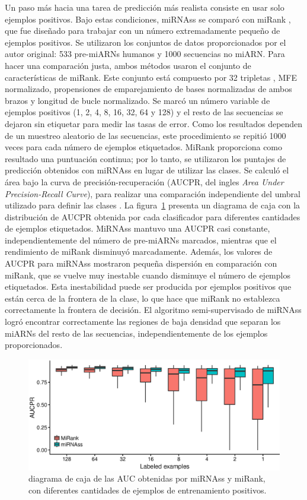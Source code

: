 Un paso más hacia una tarea de predicción más realista consiste en usar solo ejemplos positivos. Bajo estas condiciones, miRNAss se comparó con miRank
\citep{xu2008microrna}, que fue diseñado para trabajar con un número extremadamente pequeño de ejemplos positivos. Se utilizaron los conjuntos de datos
proporcionados por el autor original: 533 pre-miARNs humanos y 1000 secuencias no miARN. Para hacer una comparación justa, ambos métodos usaron el conjunto
de características de miRank. Este conjunto está compuesto por 32 tripletas \citep{xue2005classification}, MFE normalizado, propensiones de emparejamiento de
bases normalizadas de ambos brazos y longitud de bucle normalizado. Se marcó un número variable de ejemplos positivos (1, 2, 4, 8, 16, 32, 64 y 128) y el
resto de las secuencias se dejaron sin etiquetar para medir las tasas de error. Como los resultados dependen de un muestreo aleatorio de las secuencias, este
procedimiento se repitió 1000 veces para cada número de ejemplos etiquetados. MiRank proporciona como resultado una puntuación continua; por lo tanto, se
utilizaron los puntajes de predicción obtenidos con miRNAss en lugar de utilizar las clases. Se calculó el área bajo la curva de precisión-recuperación
(AUCPR, del ingles \textit{Area Under Precision-Recall Curve}), para realizar una comparación independiente del umbral utilizado para definir las clases
\citep{bradley1997use}.
La figura~\ref{fig:miRank} presenta un diagrama de caja con la distribución de AUCPR obtenida por cada clasificador para diferentes cantidades de ejemplos
etiquetados. MiRNAss mantuvo una AUCPR casi constante, independientemente del número de pre-miARNs marcados, mientras que el rendimiento de miRank disminuyó
marcadamente. Además, los valores de AUCPR para miRNAss mostraron pequeña dispersión en comparación con miRank, que se vuelve muy inestable cuando
disminuye el número de ejemplos etiquetados. Esta inestabilidad puede ser producida por ejemplos positivos que están cerca de la frontera de la clase, lo que
hace que miRank no establezca correctamente la frontera de decisión. El algoritmo semi-supervisado de miRNAss logró encontrar correctamente las regiones de
baja densidad que separan los miARNs del resto de las secuencias, independientemente de los ejemplos proporcionados.

\begin{figure}[tpb]
	\centering
	\includegraphics[width=\linewidth]{fig/few_samples_miRank.eps}
	\caption[$AUC$ con pocos ejemplos positivos]{diagrama de caja de las AUC obtenidas por miRNAss y miRank, con diferentes cantidades de ejemplos de entrenamiento positivos.}
	\label{fig:miRank}
\end{figure}

